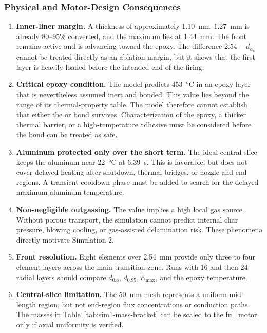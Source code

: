 \documentclass[oneside,openany]{amsdtx}
\begin{document}
\subsubsection{Physical and Motor-Design Consequences}

\begin{enumerate}[leftmargin=2.2em,label=\textbf{\arabic*.}]
  \item \textbf{Inner-liner margin.} A thickness of approximately
  \SIrange{1.10}{1.27}{mm} is already 80--95\% converted, and the maximum
   lies at \SI{1.44}{mm}. The front remains active and is advancing
  toward the epoxy. The difference \(2.54-d_{\alpha_c}\) cannot be treated
  directly as an ablation margin, but it shows that the first layer is heavily
  loaded before the intended end of the firing.

  \item \textbf{Critical epoxy condition.} The model predicts
  \SI{453}{\degreeCelsius} in an epoxy layer that is nevertheless assumed
  inert and bonded. This value lies beyond the range of its thermal-property
  table. The model therefore cannot establish that either the
   or  bond survives. Characterization of the
  epoxy, a thicker thermal barrier, or a high-temperature adhesive must be
  considered before the bond can be treated as safe.

  \item \textbf{Aluminum protected only over the short term.} The ideal central
  slice keeps the aluminum near \SI{22}{\degreeCelsius} at \SI{6.39}{s}. This
  is favorable, but does not cover delayed heating after shutdown, thermal
  bridges, or nozzle and end regions. A transient cooldown phase must be added
  to search for the delayed maximum aluminum temperature.

  \item \textbf{Non-negligible outgassing.} The  value implies a
  high local gas source. Without porous transport, the simulation cannot
  predict internal char pressure, blowing cooling, or gas-assisted
  delamination risk. These phenomena directly motivate Simulation 2.

  \item \textbf{Front resolution.} Eight elements over \SI{2.54}{mm} provide
  only three to four element layers across the main transition zone. Runs with
  16 and then 24 radial layers should compare \(d_{0.8}\), \(d_{0.95}\),
  \(\dot\alpha_\mathrm{max}\), and the epoxy temperature.

  \item \textbf{Central-slice limitation.} The \SI{50}{mm} mesh represents a
  uniform mid-length region, but not end-region flux concentrations or
  conduction paths. The masses in Table~\ref{tab:sim1-mass-bracket} can be
  scaled to the full motor only if axial uniformity is verified.
\end{enumerate}
\end{document}
